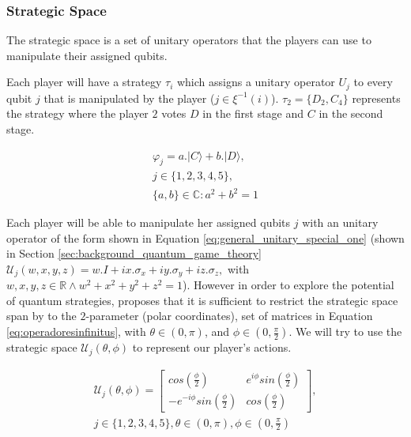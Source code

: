 \documentclass[10pt,twocolumn]{llncs}
\begin{document}
\subsubsection{Strategic Space}
\label{subsec:strategic_space}

The strategic space is a set of unitary operators that the players can use to manipulate their assigned qubits.

Each player will have a strategy $\tau_{i}$  which assigns a
unitary operator $U_{j}$ to every qubit $j$ that is manipulated
by the player ($j$$\in\xi^{-1}(i)$). $\tau_{2}= \{D_{2},C_{4}\}$ represents the strategy where the player $2$ votes $D$ in the first stage and $C$ in the second stage.

\begin{equation}
\begin{split}
\varphi_{j} = a . \vert C \rangle + b . \vert D \rangle , \\  j \in \{ 1, 2, 3, 4, 5 \}, \\ \{ a,b \} \in \mathbb{C} : a^2 + b^2 =1
\end{split}
\label{eq:opvarphiquantumstates}
\end{equation}

Each player will be able to manipulate her assigned qubits $j$ with an unitary operator of the form shown in Equation \ref{eq:general_unitary_special_one} (shown in Section \ref{sec:background_quantum_game_theory} $\mathcal{U}_{j}(w,x,y,z)=w.I + ix.\sigma_{x} + iy.\sigma_{y} + iz.\sigma_{z}, $ with $ w,x,y,z \in \mathbb{R} \wedge  
w^2 + x^2 + y^2 + z^2 =1 $). However in  order to explore the potential of quantum strategies, \cite{Eisert2008} proposes that it is sufficient to restrict the strategic space span by to the $2$-parameter (polar coordinates), set of matrices in Equation \ref{eq:operadoresinfinitus}, with $ \theta \in ( 0, \pi )$, and $\phi \in ( 0, \frac{\pi}{2})$. We will try to use the strategic space $\mathcal{U}_{j}(\theta,\phi)$ to represent our player's actions.



\begin{equation}
\begin{split}
\mathcal{U}_{j}(\theta,\phi) = \left[\begin{array}{cc}
cos(\frac{\phi}{2}) & e^{i\phi}sin(\frac{\phi}{2})\\
-e^{-i\phi}sin(\frac{\phi}{2}) & cos(\frac{\phi}{2})
\end{array}\right] , \\  j \in \{ 1, 2, 3, 4, 5 \}, \theta \in ( 0, \pi ) , \phi \in ( 0, \frac{\pi}{2})
\end{split}
\label{eq:operadoresinfinitus}
\end{equation}
\end{document}
